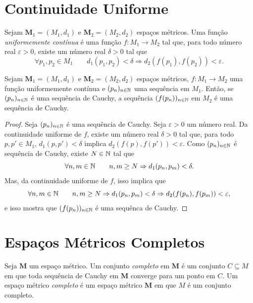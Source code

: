 \section{Continuidade Uniforme}

\begin{defi}
	Sejam $\bm M_1 = (M_1,d_1)$ e $\bm M_2 = (M_2,d_2)$ espaços métricos. Uma função \emph{uniformemente contínua} é uma função $f: M_1 \to M_2$ tal que, para todo número real $\varepsilon > 0$, existe um número real $\delta > 0$ tal que
	\begin{equation*}
	\forall p_1,p_2 \in M_1 \qquad d_1(p_1,p_2) < \delta \Rightarrow d_2(f(p_1),f(p_2)) < \varepsilon.
	\end{equation*}
\end{defi}

\begin{prop}
	Sejam $\bm M_1 = (M_1,d_1)$ e $\bm M_2 = (M_2,d_2)$ espaços métricos, $f: M_1 \to M_2$ uma função uniformemente contínua e $(p_n)_{n \in \mathbb{N}}$ uma sequência em $M_1$. Então, se $(p_n)_{n \in \mathbb{N}}$ é uma sequência de Cauchy, a sequência $(f(p_n))_{n \in \mathbb{N}}$ em $M_2$ é uma sequência de Cauchy.
\end{prop}
\begin{proof}
	Seja $(p_n)_{n \in \mathbb{N}}$ é uma sequência de Cauchy. Seja $\varepsilon > 0$ um número real. Da continuidade uniforme de $f$, existe um número real $\delta > 0$ tal que, para todo $p,p' \in M_1$, $d_1(p,p') < \delta$ implica $d_2(f(p),f(p')) < \varepsilon$. Como $(p_n)_{n \in \mathbb{N}}$ é sequência de Cauchy, existe $N \in \mathbb{N}$ tal que
	\begin{equation*}
	\forall n,m \in \mathbb{N} \qquad n,m \geq N \Rightarrow d_1(p_n,p_m) < \delta.
	\end{equation*}
Mas, da continuidade uniforme de $f$, isso implica que
	\begin{equation*}
	\forall n,m \in \mathbb{N} \qquad n,m \geq N \Rightarrow d_1(p_n,p_m) < \delta  \Rightarrow d_2(f(p_n),f(p_m)) < \varepsilon,
	\end{equation*}
e isso mostra que $(f(p_n))_{n \in \mathbb{N}}$ é uma sequênca de Cauchy.
\end{proof}


\section{Espaços Métricos Completos}

\begin{defi}
	Seja $\bm M$ um espaço métrico. Um conjunto \emph{completo} em $\bm M$ é um conjunto $C \subseteq M$ em que toda sequência de Cauchy em $\bm M$ converge para um ponto em $C$. Um espaço métrico \emph{completo} é um espaço métrico  $\bm M$ em que $M$ é um conjunto completo.
\end{defi}

